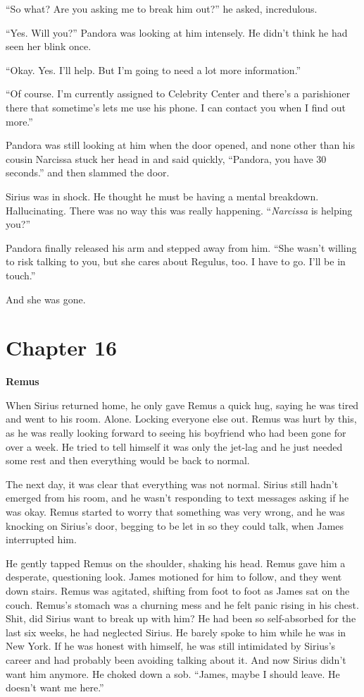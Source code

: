 \documentclass[12pt,twoside,openright]{memoir}
\begin{document}
``So what? Are you asking me to break him out?'' he asked, incredulous. 

``Yes. Will you?'' Pandora was looking at him intensely. He didn't think he had seen her blink once.

``Okay. Yes. I'll help. But I'm going to need a lot more information.''

``Of course. I'm currently assigned to Celebrity Center and there's a parishioner there that sometime's lets me use his phone. I can contact you when I find out more.'' 

Pandora was still looking at him when the door opened, and none other than his cousin Narcissa stuck her head in and said quickly, ``Pandora, you have 30 seconds.'' and then slammed the door.

Sirius was in shock. He thought he must be having a mental breakdown. Hallucinating. There was no way this was really happening. ``\textit{Narcissa} is helping you?'' 

Pandora finally released his arm and stepped away from him. ``She wasn't willing to risk talking to you, but she cares about Regulus, too. I have to go. I'll be in touch.''

And she was gone.

\chapter*{Chapter 16}

\textbf{Remus} 

When Sirius returned home, he only gave Remus a quick hug, saying he was tired and went to his room. Alone. Locking everyone else out. Remus was hurt by this, as he was really looking forward to seeing his boyfriend who had been gone for over a week. He tried to tell himself it was only the jet-lag and he just needed some rest and then everything would be back to normal. 

The next day, it was clear that everything was not normal. Sirius still hadn't emerged from his room, and he wasn't responding to text messages asking if he was okay. Remus started to worry that something was very wrong, and he was knocking on Sirius's door, begging to be let in so they could talk, when James interrupted him.

He gently tapped Remus on the shoulder, shaking his head. Remus gave him a desperate, questioning look. James motioned for him to follow, and they went down stairs. Remus was agitated, shifting from foot to foot as James sat on the couch. Remus's stomach was a churning mess and he felt panic rising in his chest. Shit, did Sirius want to break up with him?
He had been so self-absorbed for the last six weeks, he had neglected Sirius. He barely spoke to him while he was in New York. If he was honest with himself, he was still intimidated by Sirius's career and had probably been avoiding talking about it. And now Sirius didn't want him anymore. He choked down a sob. ``James, maybe I should leave. He doesn't want me here.'' 
\end{document}
